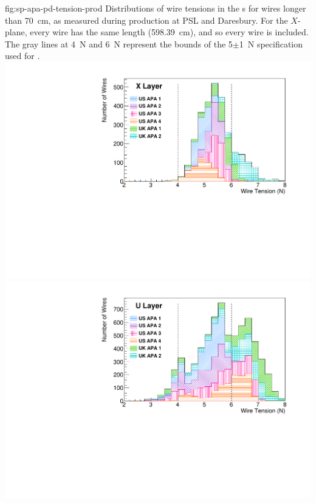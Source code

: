\begin{dunefigure}{fig:sp-apa-pd-tension-prod}
{Distributions of wire tensions in the  s for wires longer than \SI{70}{cm}, as measured during production at PSL and Daresbury. For the $X$-plane, every wire has the same length (\SI{598.39}{cm}), and so every wire is included. The gray lines at \SI{4}{N} and \SI{6}{N} represent the bounds of the 5$\pm$\SI{1}{N} specification used for . %
}
\includegraphics[height=0.28\textheight,trim=0mm 0mm 0mm 0mm,clip]{graphics/sp-apa-X-layer-tensions.pdf}
\includegraphics[height=0.28\textheight,trim=0mm 0mm 0mm 0mm,clip]{graphics/sp-apa-U-layer-tensions.pdf}

\end{dunefigure}
